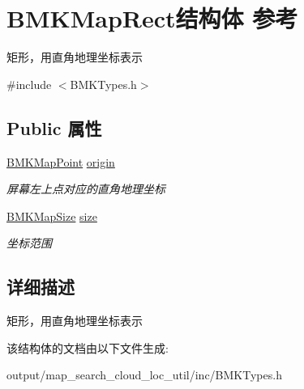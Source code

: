 \hypertarget{struct_b_m_k_map_rect}{\section{B\+M\+K\+Map\+Rect结构体 参考}
\label{struct_b_m_k_map_rect}
}


矩形，用直角地理坐标表示  




{\ttfamily \#include $<$B\+M\+K\+Types.\+h$>$}

\subsection*{Public 属性}
\begin{DoxyCompactItemize}
\item 
\hypertarget{struct_b_m_k_map_rect_aeeee8bcaabf5c65e222f1891009325f1}{\hyperlink{struct_b_m_k_map_point}{B\+M\+K\+Map\+Point} \hyperlink{struct_b_m_k_map_rect_aeeee8bcaabf5c65e222f1891009325f1}{origin}}\label{struct_b_m_k_map_rect_aeeee8bcaabf5c65e222f1891009325f1}

\begin{DoxyCompactList}\small\item\em 屏幕左上点对应的直角地理坐标 \end{DoxyCompactList}\item 
\hypertarget{struct_b_m_k_map_rect_ab83b0fb9e6e63b6ab24bdce9ced1e92e}{\hyperlink{struct_b_m_k_map_size}{B\+M\+K\+Map\+Size} \hyperlink{struct_b_m_k_map_rect_ab83b0fb9e6e63b6ab24bdce9ced1e92e}{size}}\label{struct_b_m_k_map_rect_ab83b0fb9e6e63b6ab24bdce9ced1e92e}

\begin{DoxyCompactList}\small\item\em 坐标范围 \end{DoxyCompactList}\end{DoxyCompactItemize}


\subsection{详细描述}
矩形，用直角地理坐标表示 

该结构体的文档由以下文件生成\+:\begin{DoxyCompactItemize}
\item 
output/map\+\_\+search\+\_\+cloud\+\_\+loc\+\_\+util/inc/B\+M\+K\+Types.\+h\end{DoxyCompactItemize}
